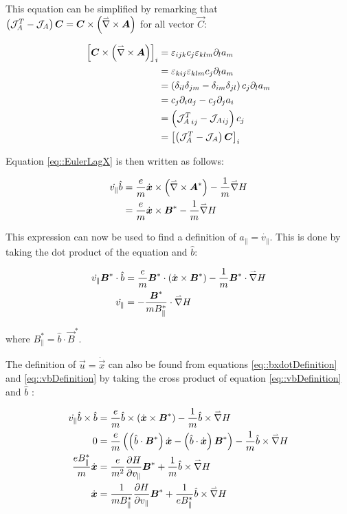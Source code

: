 This equation can be simplified by remarking that $\left({\mathcal{J}_A^T}-{\mathcal{J}_A}\right)\boldsymbol{C} = \boldsymbol{C}\times\left(\accentset{\rightharpoonup}{\nabla}\times\boldsymbol{A}\right)$ for all vector $\vec{C}$:

\begin{align*}
 \left[\boldsymbol{C}\times\left(\accentset{\rightharpoonup}{\nabla}\times\boldsymbol{A}\right)\right]_i &= \varepsilon_{ijk}c_j\varepsilon_{klm}\partial_la_m\\
 &= \varepsilon_{kij}\varepsilon_{klm}c_j\partial_la_m\\
 &= \left(\delta_{il}\delta_{jm}-\delta_{im}\delta_{jl}\right)c_j\partial_la_m\\
 &= c_j\partial_ia_j - c_j\partial_ja_i\\
 &=\left({\mathcal{J}_A^T}_{ij}-{\mathcal{J}_A}_{ij}\right)c_j\\
 &=\left[\left({\mathcal{J}_A^T}-{\mathcal{J}_A}\right)\boldsymbol{C}\right]_i
\end{align*}

Equation \ref{eq::EulerLagX} is then written as follows:

\begin{align}
 \dot{v_\parallel}\hat{b} &= \frac{e}{m}\dot{\boldsymbol{x}}\times\left(\accentset{\rightharpoonup}{\nabla}\times\boldsymbol{A}^*\right) - \frac{1}{m}\accentset{\rightharpoonup}{\nabla} H\\
  &= \frac{e}{m}\dot{\boldsymbol{x}}\times\boldsymbol{B}^* - \frac{1}{m}\accentset{\rightharpoonup}{\nabla} H\label{eq::vbDefinition}
\end{align}

This expression can now be used to find a definition of $a_\parallel = \dot{v_\parallel}$. This is done by taking the dot product of the equation and $\hat{b}$:

\begin{align}
 \dot{v_\parallel}\boldsymbol{B}^*\cdot\hat{b} &= \frac{e}{m}\boldsymbol{B}^*\cdot\left(\dot{\boldsymbol{x}}\times\boldsymbol{B}^*\right) - \frac{1}{m}\boldsymbol{B}^*\cdot\accentset{\rightharpoonup}{\nabla} H\\
 \dot{v_\parallel} &= - \frac{\boldsymbol{B}^*}{mB_\parallel^*}\cdot\accentset{\rightharpoonup}{\nabla} H\label{eq::a_parallel def}
\end{align}

where $B_\parallel^*=\hat{b}\cdot\vec{B}^*$.

The definition of $\vec{u}=\dot{\vec{x}}$ can also be found from equations \ref{eq::bxdotDefinition} and \ref{eq::vbDefinition} by taking the cross product of equation \ref{eq::vbDefinition} and $\hat{b}$ :

\begin{align}
 \dot{v_\parallel} \hat{b}\times\hat{b} &= \frac{e}{m}\hat{b}\times\left(\dot{\boldsymbol{x}}\times\boldsymbol{B}^*\right) - \frac{1}{m}\hat{b}\times\accentset{\rightharpoonup}{\nabla} H\\
 0 &= \frac{e}{m}\left(\left(\hat{b}\cdot\boldsymbol{B}^*\right)\dot{\boldsymbol{x}}-\left(\hat{b}\cdot\dot{\boldsymbol{x}}\right)\boldsymbol{B}^*\right) - \frac{1}{m}\hat{b}\times\accentset{\rightharpoonup}{\nabla} H\\
 \frac{eB_\parallel^*}{m}\dot{\boldsymbol{x}} &= \frac{e}{m^2}\frac{\partial H}{\partial v_\parallel}\boldsymbol{B}^* + \frac{1}{m}\hat{b}\times\accentset{\rightharpoonup}{\nabla} H\\
 \dot{\boldsymbol{x}} &= \frac{1}{mB_\parallel^*}\frac{\partial H}{\partial v_\parallel}\boldsymbol{B}^* + \frac{1}{eB_\parallel^*} \hat{b}\times\accentset{\rightharpoonup}{\nabla} H\label{eq::u def}
\end{align}

